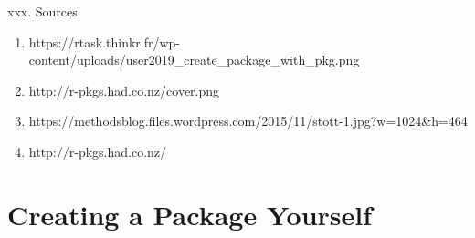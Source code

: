 \documentclass[11pt,a4paper]{beamer}
\begin{document}
\begin{frame}[t]{xxx. Sources }
	

	
	\begin{enumerate}
		\item https://rtask.thinkr.fr/wp-content/uploads/user2019\_create\_package\_with\_pkg.png
		\item http://r-pkgs.had.co.nz/cover.png
		\item https://methodsblog.files.wordpress.com/2015/11/stott-1.jpg?w=1024\&h=464
		\item http://r-pkgs.had.co.nz/
	\end{enumerate}
	
\end{frame}


\section{Creating a Package Yourself}
\end{document}
